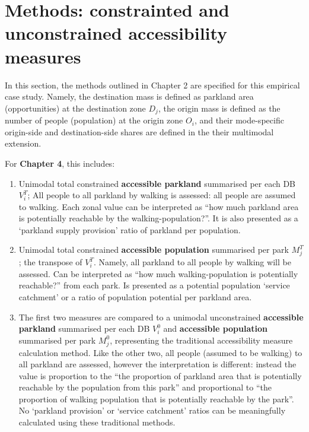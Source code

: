 \documentclass[
11pt, %
oneside, %
english, %
singlespacing, %
]{macthesis} %
\def\tightlist{}
\begin{document}
\section{Methods: constrainted and unconstrained accessibility measures}\label{methods-constrainted-and-unconstrained-accessibility-measures}

In this section, the methods outlined in Chapter 2 are specified for this empirical case study. Namely, the destination mass is defined as parkland area (opportunities) at the destination zone \(D_j\), the origin mass is defined as the number of people (population) at the origin zone \(O_i\), and their mode-specific origin-side and destination-side shares are defined in the their multimodal extension.

For \textbf{Chapter 4}, this includes:

\begin{enumerate}
\def\labelenumi{\arabic{enumi}.}
\tightlist
\item
  Unimodal total constrained \textbf{accessible parkland} summarised per each DB \(V_i^T\); All people to all parkland by walking is assessed: all people are assumed to walking. Each zonal value can be interpreted as ``how much parkland area is potentially reachable by the walking-population?''. It is also presented as a `parkland supply provision' ratio of parkland per population.
\item
  Unimodal total constrained \textbf{accessible population} summarised per park \(M_j^T\); the transpose of \(V_i^T\). Namely, all parkland to all people by walking will be assessed. Can be interpreted as ``how much walking-population is potentially reachable?'' from each park. Is presented as a potential population `service catchment' or a ratio of population potential per parkland area.
\item
  The first two measures are compared to a unimodal unconstrained \textbf{accessible parkland} summarised per each DB \(V_i^0\) and \textbf{accessible population} summarised per park \(M_j^0\), representing the traditional accessibility measure calculation method. Like the other two, all people (assumed to be walking) to all parkland are assessed, however the interpretation is different: instead the value is proportion to the ``the proportion of parkland area that is potentially reachable by the population from this park'' and proportional to ``the proportion of walking population that is potentially reachable by the park''. No `parkland provision' or `service catchment' ratios can be meaningfully calculated using these traditional methods.
\end{enumerate}
\end{document}
